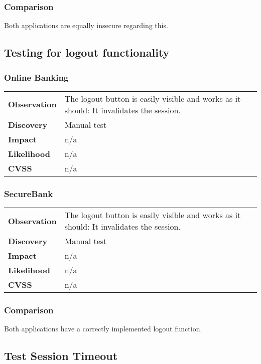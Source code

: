 \subsubsection*{Comparison}
Both applications are equally insecure regarding this.

\clearpage


\subsection{Testing for logout functionality}

\subsubsection*{Online Banking}

\begin{tabular}{l|p{10cm}}
\textbf{Observation} & The logout button is easily visible and works as it should: It invalidates the session. \\
\textbf{Discovery} & Manual test \\
\textbf{Impact} & n/a \\
\textbf{Likelihood} & n/a \\
\textbf{CVSS} & n/a \\
\end{tabular}

\subsubsection*{SecureBank}

\begin{tabular}{l|p{10cm}}
\textbf{Observation} & The logout button is easily visible and works as it should: It invalidates the session. \\
\textbf{Discovery} & Manual test \\
\textbf{Impact} & n/a \\
\textbf{Likelihood} & n/a \\
\textbf{CVSS} & n/a \\
\end{tabular}

\subsubsection*{Comparison}
Both applications have a correctly implemented logout function.

\clearpage


\subsection{Test Session Timeout}

